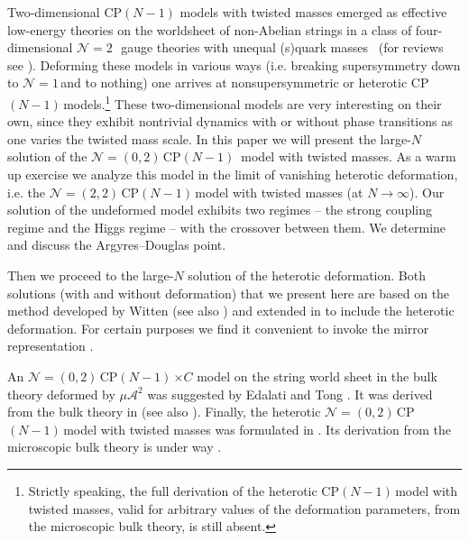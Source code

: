 \documentclass[epsfig,12pt]{article}
\newcommand{\ntwo}{${\mathcal N}=2\,$}
\newcommand{\none}{${\mathcal N}=1\,$}
\newcommand{\ntt}{${\mathcal N}=(2,2)\,$}
\newcommand{\nzt}{${\mathcal N}=(0,2)\,$}
\newcommand{\cpn}{CP$(N-1)\,$}
\newcommand{\ca}{{\mathcal A}}
\begin{document}
Two-dimensional  CP$(N-1)$ models with twisted masses
emerged as effective low-energy theories on
the worldsheet of non-Abelian strings in a class of 
four-dimensional \ntwo\, gauge theories with unequal (s)quark 
masses~\cite{HT1,ABEKY,SYmon,HT2} (for reviews see  \cite{Trev}). 
Deforming these models in various ways (i.e. breaking supersymmetry down to \none and to nothing)
one arrives at nonsupersymmetric or heterotic \cpn models.\footnote{
Strictly speaking, the full derivation of the
heterotic \cpn model with twisted masses, valid for arbitrary values of
the deformation parameters,  from the microscopic bulk theory, is still absent.
} These two-dimensional models are very 
interesting on their own,
since they exhibit nontrivial dynamics with or without phase transitions 
as one varies the twisted mass scale.
In this paper we will present the large-$N$ solution of the \nzt \mbox{\cpn}  model with twisted
masses. As a warm up exercise we analyze this model in the limit of vanishing heterotic deformation,
i.e. the \ntt \cpn model with twisted masses (at $N\to\infty$).
Our solution  of the undeformed model exhibits two regimes -- the strong coupling regime and 
the Higgs
regime -- with the crossover between them. We determine and discuss the
Argyres--Douglas point.

Then we proceed to the large-$N$ solution of the heterotic deformation.
 Both solutions (with and without deformation)
that we present here are based on the method developed by Witten
\cite{W79,W93} (see also \cite{dadvl}) and extended in \cite{SYhet} to include the heterotic deformation.
For certain purposes we find it convenient to invoke the mirror
representation \cite{MR1,MR2}. 

An \nzt \cpn$\times C$
model on the string world sheet in the bulk theory deformed by $\mu\ca^2$
was suggested by Edalati and Tong \cite{EdTo}.
It was derived from the bulk theory in \cite{SY1} (see also \cite{BSY1,BSY2}).
Finally, the heterotic \nzt  \cpn model with twisted masses was formulated in \cite{BSY3}.
Its derivation from the microscopic bulk theory is under way \cite{underway}.
\end{document}
